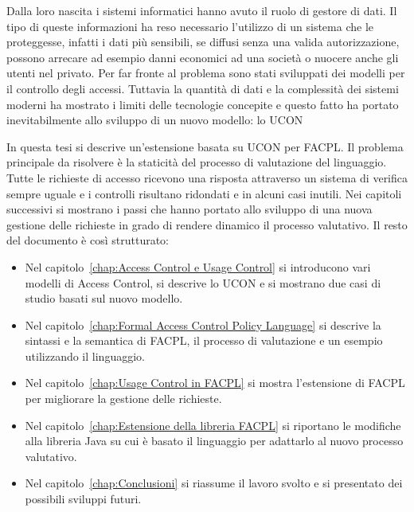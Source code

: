 Dalla loro nascita i sistemi informatici hanno avuto il ruolo di gestore di dati.
Il tipo di queste informazioni ha reso necessario l'utilizzo di un sistema che le proteggesse, infatti i
dati più sensibili, se diffusi senza una valida autorizzazione, possono arrecare ad esempio danni economici
ad una società o nuocere anche gli utenti nel privato.
Per far fronte al problema sono stati sviluppati dei modelli per il controllo degli accessi. Tuttavia la quantità di dati
e la complessità dei sistemi moderni ha mostrato i limiti delle tecnologie concepite e questo fatto ha portato inevitabilmente
allo sviluppo di un nuovo modello: lo \ac{UCON}

In questa tesi si descrive un'estensione basata su UCON per \ac{FACPL}.
Il problema principale da risolvere è la staticità del processo di valutazione del linguaggio.
Tutte le richieste di accesso ricevono una risposta attraverso un sistema di verifica sempre uguale e i controlli
risultano ridondati e in alcuni casi inutili.
Nei capitoli successivi si mostrano i passi che hanno portato allo sviluppo di una nuova gestione delle richieste
in grado di rendere dinamico il processo valutativo.
\vspace{5mm}
\newline
Il resto del documento è così strutturato:
\begin{itemize}
  \renewcommand\labelitemi{--}
  \item Nel capitolo~\ref{chap:Access Control e Usage Control}
  si introducono vari modelli di Access Control, si descrive lo \ac{UCON} e si mostrano due casi di studio basati sul nuovo modello.
  \item Nel capitolo~\ref{chap:Formal Access Control Policy Language}
  si descrive la sintassi e la semantica di \ac{FACPL}, il processo di valutazione e un esempio utilizzando il linguaggio.
  \item Nel capitolo~\ref{chap:Usage Control in FACPL}
  si mostra l'estensione di \ac{FACPL} per migliorare la gestione delle richieste.
  \item Nel capitolo~\ref{chap:Estensione della libreria FACPL}
  si riportano le modifiche alla libreria Java su cui è basato il linguaggio per adattarlo al nuovo processo valutativo.
  \item Nel capitolo~\ref{chap:Conclusioni}
  si riassume il lavoro svolto e si presentato dei possibili sviluppi futuri.
\end{itemize}
